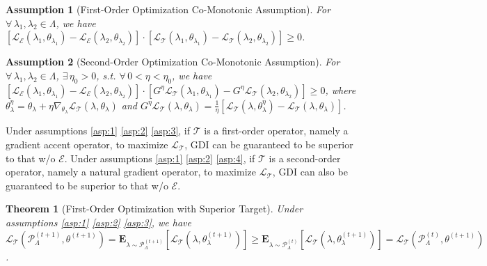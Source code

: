 \documentclass[nohyperref]{article}
\theoremstyle{plain}
\newtheorem{Theorem}{\textbf{Theorem}}
\newtheorem{Assumption}{\textbf{Assumption}}
\begin{document}
\begin{Assumption}[First-Order Optimization Co-Monotonic Assumption]
    For $\forall\, \lambda_1, \lambda_2 \in \Lambda$, we have
    $[ \mathcal{L}_{\mathcal{E}} (\lambda_1, \theta_{\lambda_1})  -  \mathcal{L}_{\mathcal{E}} (\lambda_2, \theta_{\lambda_2}) ] \cdot
    [ \mathcal{L}_{\mathcal{T}} (\lambda_1, \theta_{\lambda_1})  -  \mathcal{L}_{\mathcal{T}} (\lambda_2, \theta_{\lambda_2}) ] \geq 0$.
\label{asp:3}
\end{Assumption}

\begin{Assumption}[Second-Order Optimization Co-Monotonic Assumption]
    For $\forall\, \lambda_1, \lambda_2 \in \Lambda$,
    $\exists\, \eta_0 > 0$, s.t. $\forall\, 0 < \eta < \eta_0$, we have
    $[ \mathcal{L}_{\mathcal{E}} (\lambda_1, \theta_{\lambda_1})  -  \mathcal{L}_{\mathcal{E}} (\lambda_2, \theta_{\lambda_2}) ] \cdot
    [ G^{\eta} \mathcal{L}_{\mathcal{T}} (\lambda_1, \theta_{\lambda_1}) 
    - G^{\eta} \mathcal{L}_{\mathcal{T}} (\lambda_2, \theta_{\lambda_2}) ] \geq 0$,
    where $\theta_{\lambda}^{\eta} = \theta_{\lambda} + \eta \nabla_{\theta_{\lambda}} \mathcal{L}_{\mathcal{T}} (\lambda, \theta_{\lambda})$ and
    $G^{\eta} \mathcal{L}_{\mathcal{T}} (\lambda, \theta_{\lambda})
    = \frac{1}{\eta} \left[\mathcal{L}_{\mathcal{T}} (\lambda, \theta_{\lambda}^{\eta}) - \mathcal{L}_{\mathcal{T}} (\lambda, \theta_{\lambda}) \right]$.
\label{asp:4}
\end{Assumption}

Under assumptions \eqref{asp:1} \eqref{asp:2} \eqref{asp:3}, if $\mathcal{T}$ is a first-order operator, namely a gradient accent operator, to maximize $\mathcal{L}_{\mathcal{T}}$, GDI can be guaranteed to be superior to that w/o $\mathcal{E}$.
Under assumptions \eqref{asp:1} \eqref{asp:2} \eqref{asp:4}, if $\mathcal{T}$ is a second-order operator, namely a natural gradient operator, to maximize $\mathcal{L}_{\mathcal{T}}$, GDI can also be guaranteed to be superior to that w/o $\mathcal{E}$.

\begin{Theorem}[First-Order Optimization with Superior Target]
    Under assumptions \eqref{asp:1} \eqref{asp:2} \eqref{asp:3}, we have
    $\mathcal{L}_{\mathcal{T}} (\mathcal{P}_{\Lambda}^{(t+1)}, \theta^{(t+1)}) 
     = \textbf{E}_{\lambda \sim \mathcal{P}_{\Lambda}^{(t+1)}}  [\mathcal{L}_{\mathcal{T}} (\lambda, \theta^{(t+1)}_{\lambda})]
     \geq \textbf{E}_{\lambda \sim \mathcal{P}_{\Lambda}^{(t)}}  [\mathcal{L}_{\mathcal{T}} (\lambda, \theta^{(t+1)}_{\lambda})]
     = \mathcal{L}_{\mathcal{T}} (\mathcal{P}_{\Lambda}^{(t)}, \theta^{(t+1)})$.
\label{thm:1st_gdi}
\end{Theorem}
\end{document}
